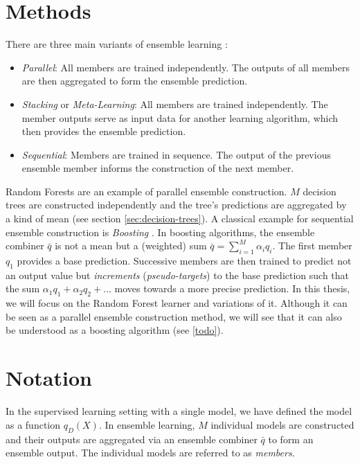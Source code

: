 \documentclass[
    a4paper, %
	fontsize=10pt, %
	twoside=false, %
]{kaobook}
\begin{document}
\section{Methods}
\label{sec:ensemble-learning-methods}
There are three main variants of ensemble learning \cite{mienye_SurveyEnsembleLearning_2022}:
\begin{itemize}
\item \textit{Parallel}: All members are trained independently. The outputs of all members are then aggregated to form the ensemble prediction.
\item \textit{Stacking} or \textit{Meta-Learning}: All members are trained independently. The member outputs serve as input data for another learning algorithm, which then provides the ensemble prediction.
\item \textit{Sequential}: Members are trained in sequence. The output of the previous ensemble member informs the construction of the next member.
\end{itemize}
Random Forests \cite{breiman_RandomForests_2001} are an example of parallel ensemble construction. $M$ decision trees are constructed independently and the tree's predictions are aggregated by a kind of mean (see section \ref{sec:decision-trees}). A classical example for sequential ensemble construction is \textit{Boosting} \cite{schapire_BoostingFoundationsAlgorithms_2012}. In boosting algorithms, the ensemble combiner $\bar{q}$ is not a mean but a (weighted) sum $\bar{q} = \sum_{i=1}^M \alpha_{i}q_{i}$. The first member $q_{1}$ provides a base prediction. Successive members are then trained to predict not an output value but \textit{increments} (\textit{pseudo-targets}) to the base prediction such that the sum $\alpha_{1}q_{1} + \alpha_{2}q_{2} + \dots$ moves towards a more precise prediction. 
In this thesis, we will focus on the Random Forest learner and variations of it. Although it can be seen as a parallel ensemble construction method, we will see that it can also be understood as a boosting algorithm (see \ref{todo}).

\section{Notation}
\label{sec:ensemble-learning-notation}

In the supervised learning setting with a single model, we have defined the model as a function $q_{D}(X)$. In ensemble learning, $M$ individual models are constructed and their outputs are aggregated via an ensemble combiner $\bar{q}$ to form an ensemble output. The individual models are referred to as \textit{members}. 
\end{document}
